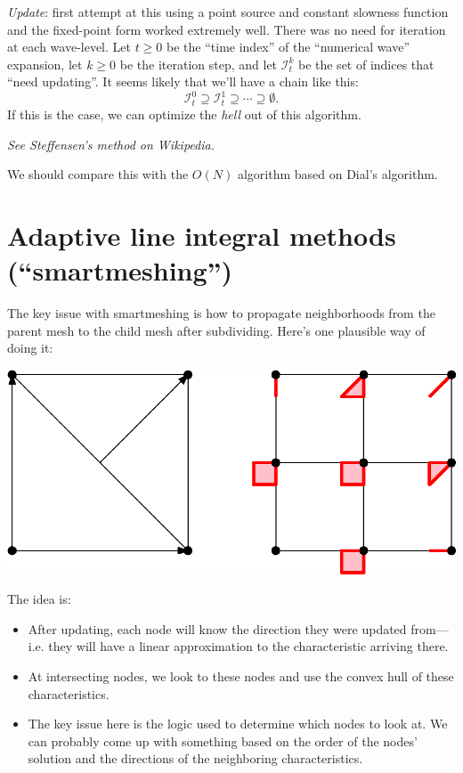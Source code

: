 \documentclass[eikonal.tex]{subfiles}
\begin{document}
\emph{Update}: first attempt at this using a point source and constant
slowness function and the fixed-point form worked extremely well. There
was no need for iteration at each wave-level. Let $t \geq 0$ be the
``time index'' of the ``numerical wave'' expansion, let $k \geq 0$ be
the iteration step, and let $\mathcal{I}_t^k$ be the set of indices
that ``need updating''. It seems likely that we'll have a chain like
this:
\begin{equation}
  \mathcal{I}_t^0 \supseteq \mathcal{I}_t^1 \supseteq \cdots \supseteq \emptyset.
\end{equation}
If this is the case, we can optimize the \emph{hell} out of this
algorithm.

\emph{See Steffensen's method on Wikipedia.}

We should compare this with the $O(N)$ algorithm based on Dial's
algorithm.

\section{Adaptive line integral methods (``smartmeshing'')}

The key issue with smartmeshing is how to propagate neighborhoods from
the parent mesh to the child mesh after subdividing. Here's one
plausible way of doing it:
\begin{center}
  \includegraphics{recursive-neighborhoods.eps}
\end{center}
The idea is:
\begin{itemize}
\item After updating, each node will know the direction they were
  updated from---i.e. they will have a linear approximation to the
  characteristic arriving there. 
\item At intersecting nodes, we look to
  these nodes and use the convex hull of these characteristics.
\item The key issue here is the logic used to determine which nodes to
  look at. We can probably come up with something based on the order
  of the nodes' solution and the directions of the neighboring
  characteristics.
\end{itemize}
\end{document}
